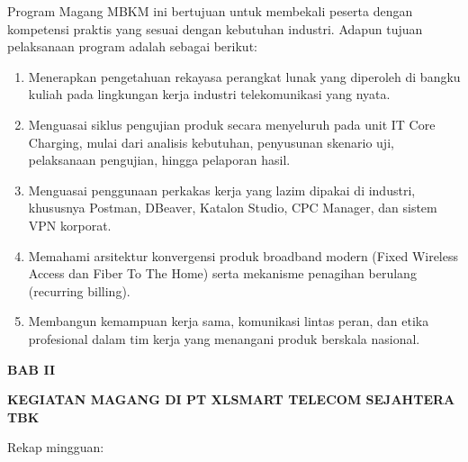 \documentclass[12pt,a4paper]{article}
\begin{document}
\vspace{0.3cm}
Program Magang MBKM ini bertujuan untuk membekali peserta dengan kompetensi praktis yang sesuai dengan kebutuhan industri. Adapun tujuan pelaksanaan program adalah sebagai berikut:
\begin{enumerate}[label=\arabic*.,leftmargin=1.5em,itemsep=2pt,topsep=2pt]
    \item Menerapkan pengetahuan rekayasa perangkat lunak yang diperoleh di bangku kuliah pada lingkungan kerja industri telekomunikasi yang nyata.
    \item Menguasai siklus pengujian produk secara menyeluruh pada unit IT Core Charging, mulai dari analisis kebutuhan, penyusunan skenario uji, pelaksanaan pengujian, hingga pelaporan hasil.
    \item Menguasai penggunaan perkakas kerja yang lazim dipakai di industri, khususnya Postman, DBeaver, Katalon Studio, CPC Manager, dan sistem VPN korporat.
    \item Memahami arsitektur konvergensi produk broadband modern (Fixed Wireless Access dan Fiber To The Home) serta mekanisme penagihan berulang (recurring billing).
    \item Membangun kemampuan kerja sama, komunikasi lintas peran, dan etika profesional dalam tim kerja yang menangani produk berskala nasional.
\end{enumerate}

\clearpage
\begin{center}
    {\bfseries\large BAB II\par}
    {\bfseries\large KEGIATAN MAGANG DI PT XLSMART TELECOM SEJAHTERA TBK\par}
\end{center}
\vspace{0.2cm}

\vspace{0.1cm}
\noindent Rekap mingguan:
\end{document}
